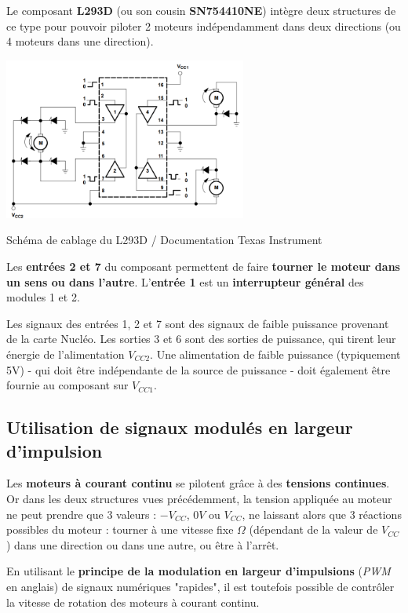 \documentclass[a4paper,11pt,titlepage]{article} %
\begin{document}
Le composant \textbf{L293D} (ou son cousin \textbf{SN754410NE}) intègre deux structures de ce type pour pouvoir piloter 2 moteurs indépendamment dans deux directions (ou 4 moteurs dans une direction).

\begin{center}
	\includegraphics[width=0.6\textwidth]{images/L293D_TI.png}
	
	Schéma de cablage du L293D / Documentation Texas Instrument
\end{center}

Les \textbf{entrées 2 et 7} du composant permettent de faire \textbf{tourner le moteur dans un sens ou dans l'autre}. L'\textbf{entrée 1} est un \textbf{interrupteur général} des modules 1 et 2.

Les signaux des entrées 1, 2 et 7 sont des signaux de faible puissance provenant de la carte Nucléo. Les sorties 3 et 6 sont des sorties de puissance, qui tirent leur énergie de l'alimentation $V_{CC2}$. Une alimentation de faible puissance (typiquement 5V) - qui doit être indépendante de la source de puissance - doit également être fournie au composant sur $V_{CC1}$.

\subsection{Utilisation de signaux modulés en largeur d'impulsion}

Les \textbf{moteurs à courant continu} se pilotent grâce à des \textbf{tensions continues}. Or dans les deux structures vues précédemment, la tension appliquée au moteur ne peut prendre que 3 valeurs : $-V_{CC}$, $0V$ ou $V_{CC}$, ne laissant alors que 3 réactions possibles du moteur : tourner à une vitesse fixe $\Omega$ (dépendant de la valeur de $V_{CC}$) dans une direction ou dans une autre, ou être à l'arrêt.

\medskip

En utilisant le \textbf{principe de la modulation en largeur d'impulsions} (\textit{PWM} en anglais) de signaux numériques "rapides", il est toutefois possible de contrôler la vitesse de rotation des moteurs à courant continu. 
\end{document}
